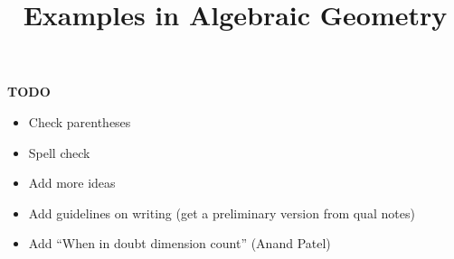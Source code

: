 \documentclass[10pt,openany]{amsbook}
\begin{document}
\title[Examples in Algebraic Geometry]{
  \vspace{0.5in}
  {\Huge{Examples in Algebraic Geometry}} \\
  \vspace{0.5in}
}



\date{}

\maketitle

\textbf{TODO}
\begin{itemize}
\item Check parentheses
\item Spell check
\item Add more ideas
\item Add guidelines on writing (get a preliminary version from qual notes)
\item Add ``When in doubt dimension count'' (Anand Patel)
\end{itemize}

\tableofcontents







\end{document}
